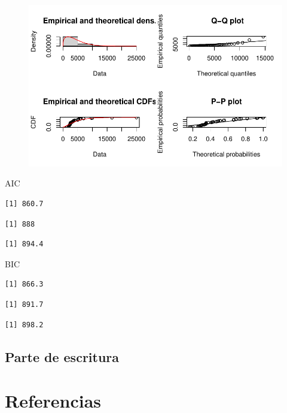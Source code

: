 \documentclass[
  letterpaper,
  onepage,
  openany]{scrreprt}
\begin{document}
\begin{figure}[H]

{\centering \includegraphics{./Bit4_files/figure-pdf/unnamed-chunk-13-1.pdf}

}

\end{figure}

AIC

\begin{verbatim}
[1] 860.7
\end{verbatim}

\begin{verbatim}
[1] 888
\end{verbatim}

\begin{verbatim}
[1] 894.4
\end{verbatim}

BIC

\begin{verbatim}
[1] 866.3
\end{verbatim}

\begin{verbatim}
[1] 891.7
\end{verbatim}

\begin{verbatim}
[1] 898.2
\end{verbatim}

\hypertarget{parte-de-escritura-2}{%
\section{Parte de escritura}\label{parte-de-escritura-2}}


\hypertarget{referencias}{%
\chapter*{Referencias}\label{referencias}}
\end{document}
